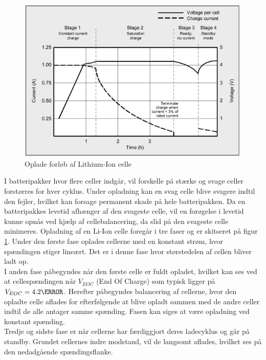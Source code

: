 \begin{figure}[h]
	\centering
	\includegraphics[width=15cm]{billeder/liion_opladning.png}
	\caption{Oplade forløb af Lithium-Ion celle}
	\label{fig:opladning_liion}
\end{figure}
\FloatBlock

I batteripakker hvor flere celler indgår, vil forskelle på stærke og svage celler forstørres for hver cyklus. Under opladning kan en svag celle blive svagere indtil den fejler, hvilket kan forsage permanent skade på hele batteripakken. Da en batteripakkes levetid afhænger af den svageste celle, vil en forøgelse i levetid kunne opnås ved hjælp af cellebalancering, da slid på den svageste celle minimeres. Opladning af en Li-Ion celle foregår i tre faser og er skitseret på figur \ref{fig:opladning_liion}.
Under den første fase oplades cellerne med en konstant strøm, hvor spændingen stiger lineært. Det er i denne fase hvor størstedelen af cellen bliver ladt op.
\\

I anden fase påbegyndes når den første celle er fuldt opladet, hvilket kan ses ved at cellespændingen når $V_{EOC}$ (End Of Charge) som typisk ligger på $V_{EOC} = 4.2 \volt$. Herefter påbegyndes balancering af cellerne, hvor den opladte celle aflades for efterfølgende at blive opladt sammen med de andre celler indtil de alle antager samme spænding.
Fasen kan siges at være opladning ved konstant spænding.
\\

Tredje og sidste fase er når cellerne har færdiggjort deres ladecyklus og går på standby. Grundet cellernes indre modstand, vil de langsomt aflades, hvilket ses på den nedadgående spændingsflanke.

